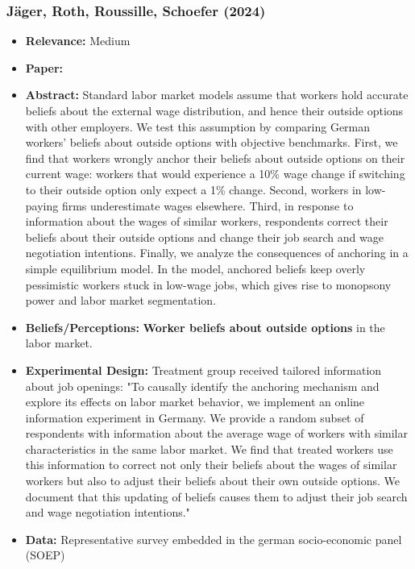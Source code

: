 \documentclass[a4paper, 12pt]{article}
\begin{document}
\subsubsection*{J\"ager, Roth, Roussille, Schoefer (2024)}
\begin{itemize}
    \item \textbf{Relevance:} Medium
    \item \textbf{Paper:} 
    \item \textbf{Abstract:} Standard labor market models assume that workers hold accurate beliefs about the external wage distribution, and hence their outside options with other employers. We test this assumption by comparing German workers’ beliefs about outside options with objective benchmarks. First, we find that workers wrongly anchor their beliefs about outside options on their current wage: workers that would experience a 10\% wage change if switching to their outside option only expect a 1\% change. Second, workers in low-paying firms underestimate wages elsewhere. Third, in response to information about the wages of similar workers, respondents correct their beliefs about their outside options and change their job search and wage negotiation intentions. Finally, we analyze the consequences of anchoring in a simple equilibrium model. In the model, anchored beliefs keep overly pessimistic workers stuck in low-wage jobs, which gives rise to monopsony power and labor market segmentation.
    \item \textbf{Beliefs/Perceptions:} \textbf{Worker beliefs about outside options} in the labor market.
    \item \textbf{Experimental Design:} Treatment group received tailored information about job openings: "To causally identify the anchoring mechanism and explore its effects on labor market behavior, we implement an online information experiment in Germany. We provide a random subset of respondents with information about the average wage of workers with similar characteristics in the same labor market. We find that treated workers use this information to correct not only their beliefs about the wages of similar workers but also to adjust their beliefs about their own outside options. We document that this updating of beliefs causes them to adjust their job search and wage negotiation intentions."
    \item \textbf{Data:} Representative survey embedded in the german socio-economic panel (SOEP)
\end{itemize}
\end{document}

